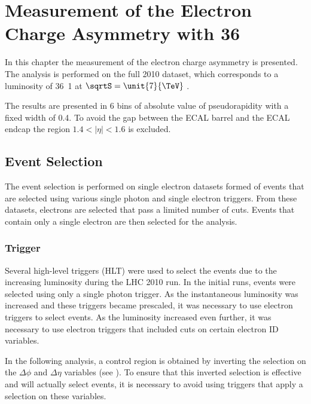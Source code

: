 \chapter[Measurement of the Electron Charge Asymmetry]{Measurement of the Electron Charge Asymmetry with \unit{36}{\invpb} }
\label{chap:analysis}

In this chapter the measurement of the electron charge asymmetry is presented.
The analysis is performed on the full 2010 dataset, which corresponds to a
luminosity of \unit{36.1}{\invpb} at $\sqrtS = \unit{7}{\TeV}$
\cite{asym36,baisini2010electron}.

The results are presented in 6 bins of absolute value of pseudorapidity with a
fixed width of 0.4. To avoid the gap between the ECAL barrel and the ECAL endcap the
region $1.4<|\eta|<1.6$ is excluded.

\section{Event Selection}

The event selection is performed on single electron datasets formed of events
that are selected using various single photon and single electron triggers. From
these datasets, electrons are selected that pass a limited number of cuts.
Events that contain only a single electron are then selected for the analysis.

\subsection{Trigger}
\label{sec:trigger1}

Several high-level triggers (HLT) were used to select the events due to the
increasing luminosity during the {LHC} 2010 run.  In the initial runs, events
were selected using only a single photon trigger.  As the instantaneous
luminosity was increased and these triggers became prescaled, it was necessary
to use electron triggers to select events.  As the luminosity increased even
further, it was necessary to use electron triggers that included cuts on certain
electron ID variables.

In the following analysis, a control region is obtained by inverting the
selection on the $\Delta\phi$ and $\Delta\eta$ variables (see
).
To ensure that this inverted selection is effective and will actually
select events, it is necessary to avoid using triggers that apply a selection on
these variables.

